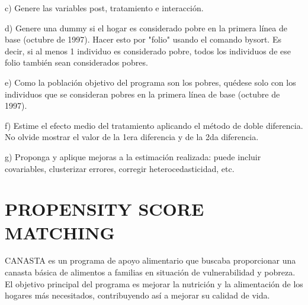 \documentclass[12pt]{article}
\begin{document}
\begin{stlog}\end{stlog}



c) Genere las variables post, tratamiento e interacción. 

\begin{stlog}\end{stlog}


d) Genere una dummy si el hogar es considerado pobre en la primera línea de base (octubre de 1997). Hacer esto por "folio" usando el comando bysort. Es decir, si al menos 1 individuo es considerado pobre, todos los individuos de ese folio también sean considerados pobres. 

\begin{stlog}\end{stlog}


e) Como la población objetivo del programa son los pobres, quédese solo con los individuos que se consideran pobres en la primera línea de base (octubre de 1997). 

\begin{stlog}\end{stlog}

f) Estime el efecto medio del tratamiento aplicando el método de doble diferencia. No olvide mostrar el valor de la 1era diferencia y de la 2da diferencia. 

\begin{stlog}\end{stlog}


g) Proponga y aplique mejoras a la estimación realizada: puede incluir covariables, clusterizar errores, corregir heterocedasticidad, etc. 

\vspace{0.5cm}

\begin{stlog}\end{stlog}



\section{PROPENSITY SCORE MATCHING }

CANASTA es un programa de apoyo alimentario que buscaba proporcionar una canasta básica de alimentos a familias en situación de vulnerabilidad y pobreza. El objetivo principal del programa es mejorar la nutrición y la alimentación de los hogares más necesitados, contribuyendo así a mejorar su calidad de vida. 
\vspace{0.5cm}
\end{document}

